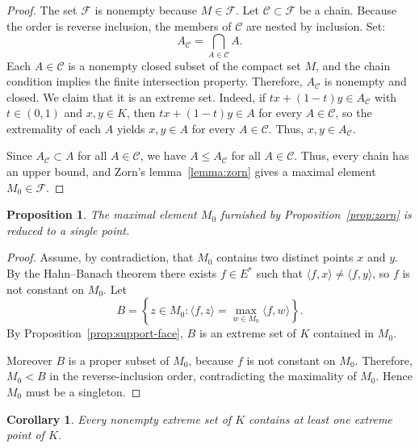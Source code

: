 \documentclass[reqno]{amsart}
\newtheorem{proposition}[theorem]{Proposition}
\newtheorem{corollary}[theorem]{Corollary}
\theoremstyle{definition}
\newcommand{\ip}[2]{\langle #1, #2 \rangle}
\begin{document}
\begin{proof}
The set $\mathcal{F}$ is nonempty because $M \in \mathcal{F}$. Let $\mathcal{C} \subset \mathcal{F}$ be a chain. Because the order is reverse inclusion, the members of $\mathcal{C}$ are nested by inclusion. Set:
\begin{equation*}
    A_\mathcal{C} = \bigcap_{A \in \mathcal{C}} A.
\end{equation*}
Each $A \in \mathcal{C}$ is a nonempty closed subset of the compact set $M$, and the chain
condition implies the finite intersection property. Therefore, $A_\mathcal{C}$ is nonempty and closed. We claim that it is an extreme set. Indeed, if $tx + (1-t)y \in A_\mathcal{C}$ with
$t \in (0,1)$ and $x,y \in K$, then $tx + (1-t)y \in A$ for every $A \in \mathcal{C}$, so the
extremality of each $A$ yields $x,y \in A$ for every $A \in \mathcal{C}$. Thus, $x,y \in A_\mathcal{C}$.

Since $A_\mathcal{C} \subset A$ for all $A \in \mathcal{C}$, we have $A \leq A_\mathcal{C}$ for all $A \in \mathcal{C}$. Thus, every chain has an upper bound, and Zorn's lemma~\ref{lemma:zorn} gives a maximal element $M_0 \in \mathcal{F}$.
\end{proof}

\begin{proposition}\label{prop:singleton}
The maximal element $M_0$ furnished by Proposition~\ref{prop:zorn} is reduced to a single point.
\end{proposition}

\begin{proof}
Assume, by contradiction, that $M_0$ contains two distinct points $x$ and $y$. By the Hahn--Banach theorem there exists $f \in E^*$ such that $\ip{f}{x} \neq \ip{f}{y}$, so $f$ is not
constant on $M_0$. Let
\begin{equation*}
    B = \left\{z \in M_0 : \ip{f}{z} = \max_{w \in M_0} \ip{f}{w} \right\}.
\end{equation*}
By Proposition~\ref{prop:support-face}, $B$ is an extreme set of $K$ contained in $M_0$.

Moreover $B$ is a proper subset of $M_0$, because $f$ is not constant on $M_0$. Therefore, $M_0 < B$ in the reverse-inclusion order, contradicting the maximality of $M_0$. Hence $M_0$ must be a singleton.
\end{proof}

\begin{corollary}\label{cor:extreme-set-contains-extreme-point}
Every nonempty extreme set of $K$ contains at least one extreme point of $K$.
\end{corollary}
\end{document}
